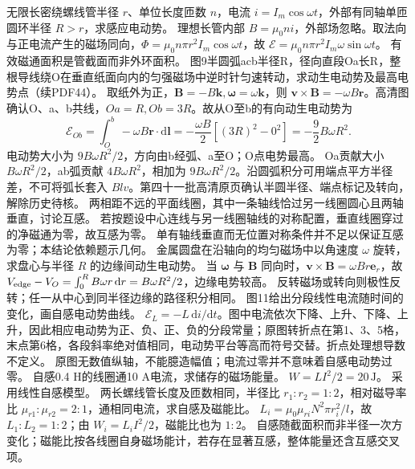 \problemtext 无限长密绕螺线管半径 $r$、单位长度匝数 $n$，电流 $i=I_m\cos\omega t$，外部有同轴单匝圆环半径 $R>r$，求感应电动势。
\workings 理想长管内部 $B=\mu_0ni$，外部场忽略。取法向与正电流产生的磁场同向，$\Phi=\mu_0n\pi r^2 I_m\cos\omega t$，故 $\mathcal E=\mu_0n\pi r^2 I_m\omega\sin\omega t$。
\crosscheck 有效磁通面积是管截面而非外环面积。
\problemtext 图9半圆弧acb半径R，径向直段Oa长R，整根导线绕O在垂直纸面向内的匀强磁场中逆时针匀速转动，求动生电动势及最高电势点（续PDF44）。
\workings 取纸外为正，$\bm B=-B\bm k,\bm\omega=\omega\bm k$，则 $\bm v\times\bm B=-\omega B\bm r$。高清图确认O、a、b共线，$Oa=R,Ob=3R$。故从O至b的有向动生电动势为
\[
\mathcal E_{Ob}=\int_O^b-\omega B\bm r\cdot\mathrm d\bm l
=-\frac{\omega B}{2}[(3R)^2-0^2]=-\frac92B\omega R^2 .
\]
电动势大小为 $9B\omega R^2/2$，方向由b经弧、a至O；O点电势最高。
\crosscheck Oa贡献大小 $B\omega R^2/2$，ab弧贡献 $4B\omega R^2$，相加为 $9B\omega R^2/2$。沿圆弧积分可用端点平方半径差，不可将弧长套入 $Blv$。第四十一批高清原页确认半圆半径、端点标记及转向，解除历史待核。
\problemtext 两相距不远的平面线圈，其中一条轴线恰过另一线圈圆心且两轴垂直，讨论互感。
\workings 若按题设中心连线与另一线圈轴线的对称配置，垂直线圈穿过的净磁通为零，故互感为零。
\crosscheck 单有轴线垂直而无位置对称条件并不足以保证互感为零；本结论依赖题示几何。
\problemtext 金属圆盘在沿轴向的均匀磁场中以角速度 $\omega$ 旋转，求盘心与半径 $R$ 的边缘间动生电动势。
\workings 当 $\bm\omega$ 与 $\bm B$ 同向时，$\bm v\times\bm B=\omega Br\bm e_r$，故 $V_{\rm edge}-V_O=\int_0^R B\omega r\,\mathrm dr=B\omega R^2/2$，边缘电势较高。
\crosscheck 反转磁场或转向则极性反转；任一从中心到同半径边缘的路径积分相同。
\problemtext 图11给出分段线性电流随时间的变化，画自感电动势曲线。
\workings $\mathcal E_L=-L\,\mathrm di/\mathrm dt$。图中电流依次下降、上升、下降、上升，因此相应电动势为正、负、正、负的分段常量；原图转折点在第1、3、5格，末点第6格，各段斜率绝对值相同，电动势平台等高而符号交替。折点处理想导数不定义。
\crosscheck 原图无数值纵轴，不能臆造幅值；电流过零并不意味着自感电动势过零。
\problemtext 自感0.4 H的线圈通10 A电流，求储存的磁场能量。
\workings $W=LI^2/2=20\,\mathrm J$。
\crosscheck 采用线性自感模型。
\problemtext 两长螺线管长度及匝数相同，半径比 $r_1:r_2=1:2$，相对磁导率比 $\mu_{r1}:\mu_{r2}=2:1$，通相同电流，求自感及磁能比。
\workings $L_i=\mu_0\mu_{ri}N^2\pi r_i^2/l$，故 $L_1:L_2=1:2$；由 $W_i=L_i I^2/2$，磁能比也为 $1:2$。
\crosscheck 自感随截面积而非半径一次方变化；磁能比按各线圈自身磁场能计，若存在显著互感，整体能量还含互感交叉项。
